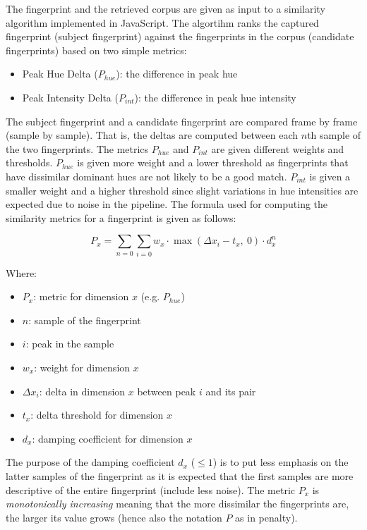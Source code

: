 \documentclass[thesis.tex]{subfiles}
\begin{document}
The fingerprint and the retrieved corpus are given as input to a similarity algorithm implemented in JavaScript. The algortihm ranks the captured fingerprint (subject fingerprint) against the fingerprints in the corpus (candidate fingerprints) based on two simple metrics:

\begin{itemize}
	\item Peak Hue Delta ($P_{hue}$): the difference in peak hue
	\item Peak Intensity Delta ($P_{int}$): the difference in peak hue intensity
\end{itemize}

The subject fingerprint and a candidate fingerprint are compared frame by frame (sample by sample). That is, the deltas are computed between each $n$th sample of the two fingerprints. The metrics $P_{hue}$ and $P_{int}$ are given different weights and thresholds. $P_{hue}$ is given more weight and a lower threshold as fingerprints that have dissimilar dominant hues are not likely to be a good match. $P_{int}$ is given a smaller weight and a higher threshold since slight variations in hue intensities are expected due to noise in the pipeline. The formula used for computing the similarity metrics for a fingerprint is given as follows:

\begin{equation}
\label{equation:similarity-metric}
	P_x = \sum \limits_{n=0} \sum \limits_{i=0} { { w_x \cdot \max (\Delta{x_i}-t_x,\ 0) \cdot d_x^n } }
\end{equation}

Where:
\begin{itemize}[label=]
    \item $P_x$: metric for dimension $x$ (e.g. $P_{hue}$)
    \item $n$: sample of the fingerprint
    \item $i$: peak in the sample
    \item $w_x$: weight for dimension $x$
    \item $\Delta{x_i}$: delta in dimension $x$ between peak $i$ and its pair
    \item $t_x$: delta threshold for dimension $x$
    \item $d_x$: damping coefficient for dimension $x$
\end{itemize}

\noindent The purpose of the damping coefficient $d_x$ ($\leq 1$) is to put less emphasis on the latter samples of the fingerprint as it is expected that the first samples are more descriptive of the entire fingerprint (include less noise). The metric $P_x$ is \emph{monotonically increasing} meaning that the more dissimilar the fingerprints are, the larger its value grows (hence also the notation $P$ as in penalty).
\end{document}
